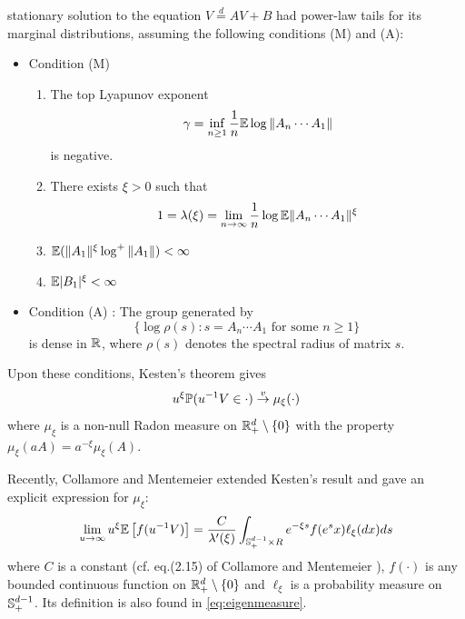 \documentclass[aoas,preprint]{imsart}
\numberwithin{equation}{section}
\theoremstyle{plain}
\begin{document}
stationary solution to the equation
$V \overset{d}{=} A V + B$ had power-law tails
for its marginal distributions, assuming the following conditions (M)
and (A):
\begin{itemize}
\item Condition (M)
  \begin{enumerate}
  \item The top Lyapunov exponent
    \[
    \gamma = \inf_{n \geq 1} {1 \over n}\mathbb{E} \log \|A_n \cdots A_1\|
    \]
    is negative.
  \item There exists $\xi > 0$ such that
    \[
    1 = \lambda(\xi) = \lim_{n \to \infty} {1 \over n} \log \mathbb{E} \|A_n \cdots A_1\|^\xi
    \]
  \item $\mathbb{E} (\|A_1\|^\xi \log^+\|A_1\|) < \infty$
  \item $\mathbb{E} |B_1|^\xi < \infty$
  \end{enumerate}
\item Condition (A) : The group generated by
  \[
  \{\log\rho(s): s = A_n \cdots A_1 \text{ for some } n \geq 1\}
  \]
  is dense in $\mathbb R$, where $\rho(s)$ denotes the spectral
  radius of matrix $s$.
\end{itemize}
Upon these conditions, Kesten's theorem gives
\begin{equation}
  \label{eq:kesten}
  u^\xi \P(u^{-1} V \in \cdot) \overset{v}{\to} \mu_\xi(\cdot)
\end{equation}
where $\mu_\xi$ is a non-null Radon measure on
$\mathbb R^d_+ \setminus \{0\}$ with the property
$\mu_\xi(a A) = a^{-\xi} \mu_\xi(A)$.

Recently, Collamore and Mentemeier \cite{collamore:mentemeier:2016}
extended Kesten's result and gave an explicit expression for $\mu_\xi$:
\begin{equation}
  \label{eq:CollamoreMentemeier}
  \lim_{u \to \infty} u^{\xi} \E \left[
    f(u^{-1} V)
    \right]
  =
  {C \over \lambda'(\xi)}  
  \int_{\sphere^{d-1}_+ \times R} e^{-\xi s} f(e^s x) \ell_\xi(dx) ds
\end{equation}
where $C$ is a constant (cf. eq.(2.15) of Collamore and Mentemeier
\cite{collamore:mentemeier:2016}), $f(\cdot)$ is any bounded
continuous function on $\mathbb R^{d}_+ \setminus \{0\}$  and
$\ell_\xi$ is a probability measure on $\mathbb S_+^{d-1}$. Its definition
is also found in \eqref{eq:eigenmeasure}.
\end{document}
